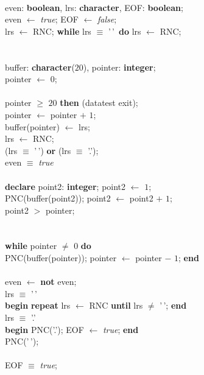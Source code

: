 \documentclass[openany,nobib]{tufte-book}
\newcommand{\kw}[1]{{\bf #1}}
\newcommand{\ind}[1]{\-\hspace{\dimexpr 2mm*#1\relax}}
\newcommand{\spchar}{'\textvisiblespace\,'}
\begin{document}
\noindent\kw{begin} \\
\ind{1}\kw{declare} even: \kw{boolean}, lrs: \kw{character}, EOF: \kw{boolean};
\\
\ind{1}even $\gets$ {\sl true}; EOF $\gets$ {\sl false};\\
\ind{1}lrs $\gets$ RNC; \kw{while} lrs $\equiv$ \spchar\ \kw{do} lrs $\gets$
RNC;\\
\ind{1}\kw{repeat} \\
\ind{2}\kw{begin} \\
\ind{3}\kw{declare} buffer: \kw{character}($20$), pointer: \kw{integer};\\
\ind{3}pointer $\gets$ $0$;\\
\ind{3}\kw{repeat} \\
\ind{4}\kw{if} pointer $\geq$ $20$ \kw{then} (datatest exit);\\
\ind{4}pointer $\gets$ pointer $+$ $1$;\\
\ind{4}buffer(pointer) $\gets$ lrs;\\
\ind{4}lrs $\gets$ RNC;\\
\ind{3}\kw{until} (lrs $\equiv$ \spchar) \kw{or} (lrs $\equiv$ '.');\\
\ind{3}\kw{if} even $\equiv$ {\sl true}\\
\ind{4}\kw{then} \\
\ind{5}\kw{begin} \kw{declare} point2: \kw{integer}; point2 $\gets$ $1$;\\
\ind{5}\kw{repeat} PNC(buffer(point2)); point2 $\gets$ point2 $+$ $1$;\\
\ind{5}\kw{until} point2 $>$ pointer;\\
\ind{5}\kw{end} \\
\ind{4}\kw{else} \\
\ind{5}\kw{begin} \kw{while} pointer $\neq$ $0$ \kw{do} \\
\ind{6}\kw{begin} PNC(buffer(pointer)); pointer $\gets$ pointer $-$ $1$;
\kw{end} \\
\ind{5}\kw{end} \\
\ind{3}even $\gets$ \kw{not} even;\\
\ind{3}\kw{if} lrs $\equiv$ \spchar\\
\ind{4}\kw{then} \kw{begin} \kw{repeat} lrs $\gets$ RNC \kw{until} lrs $\neq$
\spchar; \kw{end} \\
\ind{3}\kw{if} lrs $\equiv$ '.'\\
\ind{4}\kw{then} \kw{begin} PNC('.'); EOF $\gets$ {\sl true}; \kw{end} \\
\ind{4}\kw{else} PNC(\spchar);\\
\ind{2}\kw{end} \\
\ind{1}\kw{until} EOF $\equiv$ {\sl true};\\
\noindent\kw{end}
\end{document}
